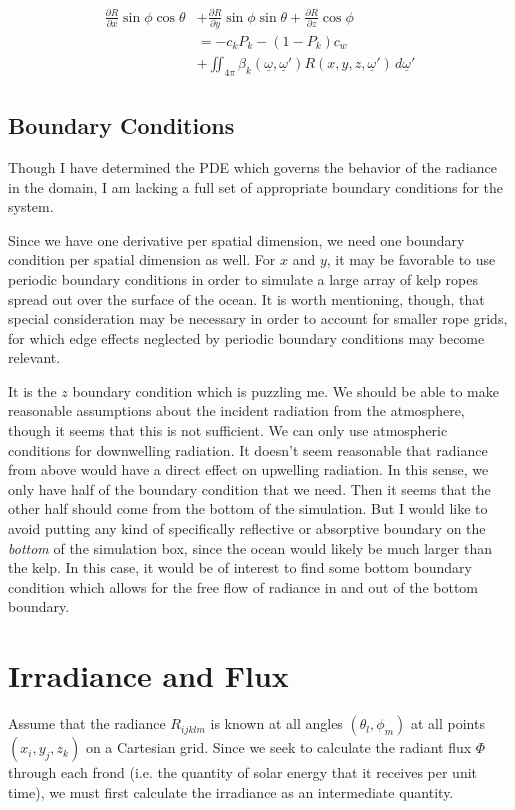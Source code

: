 \begin{align}
	\begin{split}
	\frac{\partial R}{\partial x}\sin\phi \cos\theta 
	&+ \frac{\partial R}{\partial y}\sin\phi \sin\theta
	+ \frac{\partial R}{\partial z}\cos\phi \\ 
	&= - c_kP_k - (1-P_k)c_w \\
	&+ \iint_{4\pi}
	\beta_k(\underline{\omega},\underline{\omega}')
	R(x,y,z,\underline{\omega}')\,d\underline{\omega}'
	\end{split}
	\label{eqn:rte2}
\end{align}
\subsection{Boundary Conditions}
Though I have determined the PDE which governs the behavior of the radiance in the domain, I am lacking a full set of appropriate boundary conditions for the system.

Since we have one derivative per spatial dimension, we need one boundary condition per spatial dimension as well.
For $x$ and $y$, it may be favorable to use periodic boundary conditions in order to simulate a large array of kelp ropes spread out over the surface of the ocean.
It is worth mentioning, though, that special consideration may be necessary in order to account for smaller rope grids, for which edge effects neglected by periodic boundary conditions may become relevant.

It is the $z$ boundary condition which is puzzling me.
We should be able to make reasonable assumptions about the incident radiation from the atmosphere, though it seems that this is not sufficient.
We can only use atmospheric conditions for downwelling radiation.
It doesn't seem reasonable that radiance from above would have a direct effect on upwelling radiation.
In this sense, we only have half of the boundary condition that we need.
Then it seems that the other half should come from the bottom of the simulation.
But I would like to avoid putting any kind of specifically reflective or absorptive boundary on the \textit{bottom} of the simulation box, since the ocean would likely be much larger than the kelp.
In this case, it would be of interest to find some bottom boundary condition which allows for the free flow of radiance in and out of the bottom boundary.

\section{Irradiance and Flux}
Assume that the radiance $R_{ijklm}$ is known at all angles $(\theta_l,\phi_m)$ at all points $(x_i,y_j,z_k)$ on a Cartesian grid.
Since we seek to calculate the radiant flux $\Phi$ through each frond (i.e. the quantity of solar energy that it receives per unit time), we must first calculate the irradiance as an intermediate quantity.


